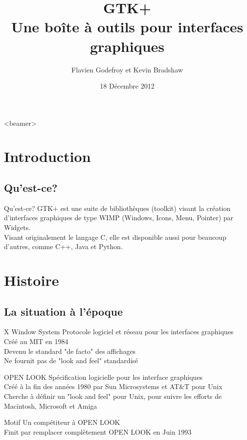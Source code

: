 \documentclass{beamer}
\title[GTK+]{GTK+\\Une boîte à outils pour interfaces graphiques}
\author{Flavien Godefroy et Kevin Bradshaw}
\date{18 Décembre 2012}
\begin{document}
  \begin{frame}
    \titlepage
  \end{frame}

  \begin{frame}<beamer>
      \frametitle{}
      \tableofcontents
    \end{frame}


  \section{Introduction}

  \subsection{Qu'est-ce?}
    \begin{frame}{Qu'est-ce?}
    GTK+ est une suite de bibliothèques (toolkit) visant la création d'interfaces graphiques de type WIMP (Windows, Icons, Menu, Pointer) par Widgets.\\
    Visant originalement le langage C, elle est disponible aussi pour beaucoup d'autres, comme C++, Java et Python.
  \end{frame}


  \section{Histoire}
  \subsection{La situation à l'époque}
  \begin{frame}{X Window System}
    Protocole logiciel et réseau pour les interfaces graphiques\\
    Créé au MIT en 1984\\
    Devenu le standard "de facto" des affichages\\
    Ne fournit pas de "look and feel" standardisé
  \end{frame}
  \begin{frame}{OPEN LOOK}
    Spécification logicielle pour les interface graphiques\\
    Créé à la fin des années 1980 par Sun Microsystems et AT\&T pour Unix\\
    Cherche à définir un "look and feel" pour Unix, pour suivre les efforts de Macintosh, Microsoft et Amiga
  \end{frame}
  \begin{frame}{Motif}
    Un compétiteur à OPEN LOOK\\
    Finit par remplacer complètement OPEN LOOK en Juin 1993
  \end{frame}
\end{document}
